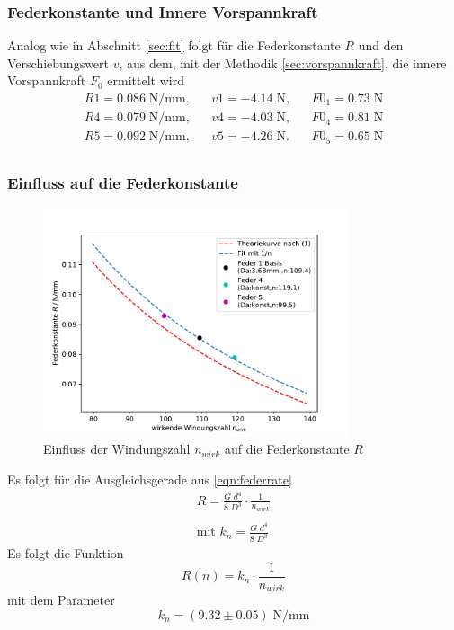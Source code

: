\subsubsection{Federkonstante und Innere Vorspannkraft}
Analog wie in Abschnitt \ref{sec:fit} folgt für die Federkonstante $R$
und den Verschiebungswert $v$, aus dem, mit der Methodik \ref{sec:vorspannkraft},
die innere Vorspannkraft $F_0$ ermittelt wird
\begin{align*}
  R1= 0.086\;\si{\N\per\mm}, &&  v1= -4.14\;\si{\N}, && F0_1=0.73\;\si{\N}\\
  R4= 0.079\;\si{\N\per\mm}, &&  v4= -4.03\;\si{\N}, && F0_4=0.81\;\si{\N}\\
  R5= 0.092\;\si{\N\per\mm}, &&  v5= -4.26\;\si{\N}. && F0_5=0.65\;\si{\N}\\
\end{align*}


\subsubsection{Einfluss auf die Federkonstante}
\begin{figure}[H]
  \center
  \includegraphics[width=0.8\textwidth]{plots/n_konstante_dia.pdf}
  \caption{Einfluss der Windungszahl $n_{wirk}$ auf die Federkonstante $R$}
  \label{fig:R_n_dia}
\end{figure}
Es folgt für die Ausgleichsgerade aus \ref{eqn:federrate}
\begin{align*}
  R=\frac{G\;d^4}{8\;D^3}\cdot \frac{1}{n_{wirk}} \\\\  
  \text{mit } k_n=\frac{G\;d^4}{8\;D^3}
\end{align*}
Es folgt die Funktion
\begin{equation*}
  R(n)=k_n \cdot \frac{1}{n_{wirk}}
\end{equation*}
mit dem Parameter
\begin{equation*}
  k_n=(9.32 \pm 0.05) \;\si{\N\per\mm}
\end{equation*}


